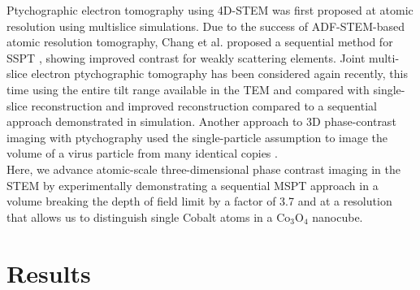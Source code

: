 \documentclass[12pt]{iopart}
\begin{document}
Ptychographic electron tomography using 4D-STEM was first proposed at atomic resolution \cite{vandenbroek_Koch_2013} using multislice simulations. Due to the success of ADF-STEM-based atomic resolution tomography, Chang et al. proposed a sequential method for SSPT \cite{chang2020ptychographic}, showing improved contrast for weakly scattering elements. Joint multi-slice electron ptychographic tomography has been considered again recently, this time using the entire tilt range available in the TEM and compared with single-slice reconstruction \cite{Lee_Lee_Park_Ophus_Yang_2023} and improved reconstruction compared to a sequential approach demonstrated in simulation.
 Another approach to 3D phase-contrast imaging with ptychography used the single-particle assumption to image the volume of a virus particle from many identical copies \cite{Pei_Zhou_Huang_Boyce_Kim_Liberti_Hu_Sasaki_Nellist_Zhang_2023}.\\ 
Here, we advance atomic-scale three-dimensional phase contrast imaging in the STEM by experimentally demonstrating a sequential MSPT approach in a volume breaking the depth of field limit by a factor of 3.7 and at a resolution that allows us to distinguish single Cobalt atoms in a $\mathrm{Co_3O_4}$ nanocube.
\section{Results}
\end{document}
